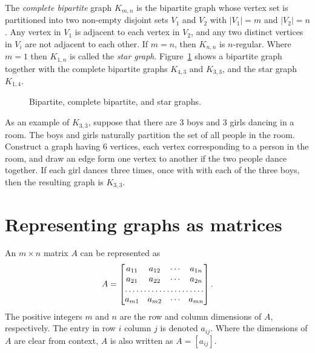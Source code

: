 The \emph{complete bipartite} graph
$K_{m,n}$ is the bipartite graph whose vertex set is
partitioned into two non-empty disjoint sets $V_1$ and $V_2$ with
$|V_1| = m$ and $|V_2| = n$. Any vertex in $V_1$ is adjacent to each
vertex in $V_2$, and any two distinct vertices in $V_i$ are not
adjacent to each other. If $m = n$, then $K_{n,n}$ is
$n$-regular. Where $m = 1$ then $K_{1,n}$ is called the
\emph{star graph}.
Figure~\ref{fig:introduction:bipartite_complete_bipartite_graphs}
shows a bipartite graph together with the complete bipartite graphs
$K_{4,3}$ and $K_{3,3}$, and the star graph $K_{1,4}$.

\begin{figure}[!htbp]
\centering

\caption{Bipartite, complete bipartite, and star graphs.}
\label{fig:introduction:bipartite_complete_bipartite_graphs}
\end{figure}

As an example of $K_{3,3}$, suppose that there are $3$ boys and $3$
girls dancing in a room. The boys and girls naturally partition the
set of all people in the room. Construct a graph having $6$ vertices,
each vertex corresponding to a person in the room, and draw an edge
form one vertex to another if the two people dance together. If each
girl dances three times, once with with each of the three boys, then
the resulting graph is $K_{3,3}$.



\section{Representing graphs as matrices}
\label{sec:introduction:matrix_representation}

An $m \times n$ matrix $A$ can be represented as
\[
A
=
\begin{bmatrix}
a_{11} & a_{12} & \cdots & a_{1n} \\
a_{21} & a_{22} & \cdots & a_{2n} \\
\hdotsfor{4} \\
a_{m1} & a_{m2} & \cdots & a_{mn} \\
\end{bmatrix}.
\]
The positive integers $m$ and $n$ are the row and column dimensions of
$A$, respectively. The entry in row $i$ column $j$ is denoted
$a_{ij}$. Where the dimensions of $A$ are clear from context, $A$ is
also written as $A = [a_{ij}]$.

